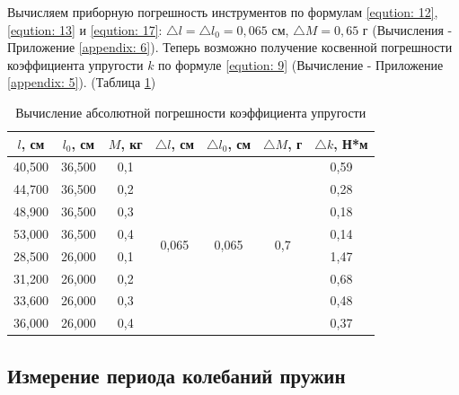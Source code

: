 Вычисляем приборную погрешность инструментов по формулам \ref{eqution: 12}, \ref{eqution: 13} и \ref{eqution: 17}: $\triangle l = \triangle l_0 = 0,065 \text{ см}$, $\triangle M = 0,65 \text{ г}$ (Вычисления - Приложение \ref{appendix: 6}). Теперь возможно получение косвенной погрешности коэффициента упругости $k$ по формуле \ref{eqution: 9} (Вычисление - Приложение \ref{appendix: 5}). (Таблица \ref{tabular:error_1})
\begin{table}[H]
	\caption{Вычисление абсолютной погрешности коэффициента упругости}
	\label{tabular:error_1}
	\centering
	\begin{tabular}{|c|c|c|c|c|c|c|}
		\hline
		$l$, см & $l_0$, см & $M$, кг &   $\triangle l$, см    &  $\triangle l_0$, см   &    $\triangle M$, г    & $\triangle k$, Н*м \\ \hline
		40,500  &  36,500   &   0,1   & \multirow{8}{*}{0,065} & \multirow{8}{*}{0,065} & \multirow{8}{*}{0,7} &        0,59        \\
		44,700  &  36,500   &   0,2   &                        &                        &                        &        0,28        \\
		48,900  &  36,500   &   0,3   &                        &                        &                        &        0,18        \\
		53,000  &  36,500   &   0,4   &                        &                        &                        &        0,14        \\
		28,500  &  26,000   &   0,1   &                        &                        &                        &        1,47        \\
		31,200  &  26,000   &   0,2   &                        &                        &                        &        0,68        \\
		33,600  &  26,000   &   0,3   &                        &                        &                        &        0,48        \\
		36,000  &  26,000   &   0,4   &                        &                        &                        &        0,37        \\ \hline
	\end{tabular}
\end{table}

\subsection{Измерение  периода колебаний пружин}

